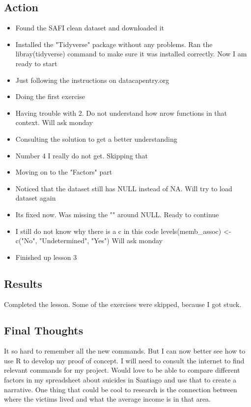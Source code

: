 \documentclass{article}
\begin{document}
\subsection{Action}
\begin{itemize}
    \item Found the SAFI clean dataset and downloaded it
    \item Installed the "Tidyverse" package without any problems. Ran the libray(tidyverse) command to make sure it was installed correctly. Now I am ready to start
    \item Just following the instructions on datacapentry.org 
    \item Doing the first exercise 
    \item Having trouble with 2. Do not understand how nrow functions in that context. Will ask monday 
    \item Consulting the solution to get a better understanding 
    \item Number 4 I really do not get. Skipping that 
    \item Moving on to the "Factors" part 
    \item Noticed that the dataset still has NULL instead of NA. Will try to load dataset again
    \item Its fixed now. Was missing the "" around NULL. Ready to continue 
    \item I still do not know why there is a c in this code levels(memb_assoc) <- c("No", "Undetermined", "Yes") Will ask monday
    \item Finished up lesson 3
    \end{itemize}

\subsection{Results}
\text Completed the lesson. Some of the exercises were skipped, because I got stuck. 

\subsection{Final Thoughts}
\text It so hard to remember all the new commands. But I can now better see how to use R to develop my proof of concept. I will need to consult the internet to find relevant commands for my project. Would love to be able to compare different factors in my spreadsheet about suicides in Santiago and use that to create a narrative. One thing that could be cool to research is the connection between where the victims lived and what the average income is in that area. 
\end{document}

